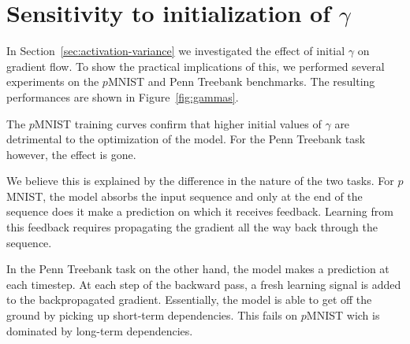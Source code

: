 \documentclass{article} %
\begin{document}




\appendix

\section{Sensitivity to initialization of $\gamma$}

In Section~\ref{sec:activation-variance} we investigated the effect of initial $\gamma$ on gradient flow.
To show the practical implications of this, we performed several experiments on the $p$MNIST and Penn Treebank benchmarks.
The resulting performances are shown in Figure~\ref{fig:gammas}.

The $p$MNIST training curves confirm that higher initial values of $\gamma$ are detrimental to the optimization of the model.
For the Penn Treebank task however, the effect is gone.

We believe this is explained by the difference in the nature of the two tasks.
For $p$MNIST, the model absorbs the input sequence and only at the end of the sequence does it make a prediction on which it receives feedback.
Learning from this feedback requires propagating the gradient all the way back through the sequence.

In the Penn Treebank task on the other hand, the model makes a prediction at each timestep.
At each step of the backward pass, a fresh learning signal is added to the backpropagated gradient.
Essentially, the model is able to get off the ground by picking up short-term dependencies.
This fails on $p$MNIST wich is dominated by long-term dependencies.~\cite{urnn}
\end{document}
